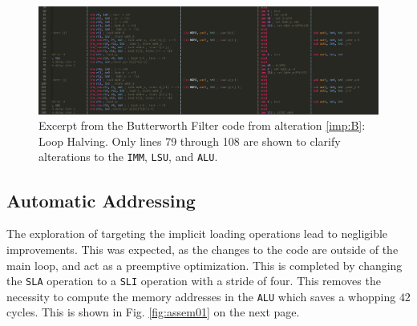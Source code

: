 \documentclass[letterpaper, 10 pt, conference]{ieeeconf}  %
\begin{document}
\begin{figure}[ht]
\begin{center}
\includegraphics[scale=0.265]{images/assem02.png}
\caption{Excerpt from the Butterworth Filter code from alteration \ref{imp:B}: Loop Halving. Only lines 79 through 108 are shown to clarify alterations to the \texttt{IMM}, \texttt{LSU}, and \texttt{ALU}.}
\label{fig:assem02}
\end{center}
\end{figure}

\subsection{Automatic Addressing}
\label{imp:C}

The exploration of targeting the implicit loading operations lead to negligible improvements. This was expected, as the changes to the code are outside of the main loop, and act as a preemptive optimization. This is completed by changing the \texttt{SLA} operation to a \texttt{SLI} operation with a stride of four. This removes the necessity to compute the memory addresses in the \texttt{ALU} which saves a whopping $42$ cycles. This is shown in Fig. \ref{fig:assem01} on the next page.
\end{document}
